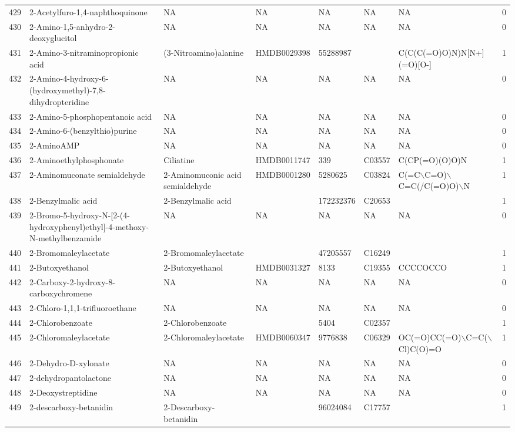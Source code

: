 \documentclass[a4paper]{article}
\begin{document}
\begin{longtable}{rlllllll}
  429 & 2-Acetylfuro-1,4-naphthoquinone & NA & NA & NA & NA & NA & 0 \\ 
  430 & 2-Amino-1,5-anhydro-2-deoxyglucitol & NA & NA & NA & NA & NA & 0 \\ 
  431 & 2-Amino-3-nitraminopropionic acid & (3-Nitroamino)alanine & HMDB0029398 & 55288987 &  & C(C(C(=O)O)N)N[N+](=O)[O-] & 1 \\ 
  432 & 2-Amino-4-hydroxy-6-(hydroxymethyl)-7,8-dihydropteridine & NA & NA & NA & NA & NA & 0 \\ 
  433 & 2-Amino-5-phosphopentanoic acid & NA & NA & NA & NA & NA & 0 \\ 
  434 & 2-Amino-6-(benzylthio)purine & NA & NA & NA & NA & NA & 0 \\ 
  435 & 2-AminoAMP & NA & NA & NA & NA & NA & 0 \\ 
  436 & 2-Aminoethylphosphonate & Ciliatine & HMDB0011747 & 339 & C03557 & C(CP(=O)(O)O)N & 1 \\ 
  437 & 2-Aminomuconate semialdehyde & 2-Aminomuconic acid semialdehyde & HMDB0001280 & 5280625 & C03824 & C(=C$\backslash$C=O)$\backslash$C=C(/C(=O)O)$\backslash$N & 1 \\ 
  438 & 2-Benzylmalic acid & 2-Benzylmalic acid &  & 172232376 & C20653 &  & 1 \\ 
  439 & 2-Bromo-5-hydroxy-N-[2-(4-hydroxyphenyl)ethyl]-4-methoxy-N-methylbenzamide & NA & NA & NA & NA & NA & 0 \\ 
  440 & 2-Bromomaleylacetate & 2-Bromomaleylacetate &  & 47205557 & C16249 &  & 1 \\ 
  441 & 2-Butoxyethanol & 2-Butoxyethanol & HMDB0031327 & 8133 & C19355 & CCCCOCCO & 1 \\ 
  442 & 2-Carboxy-2-hydroxy-8-carboxychromene & NA & NA & NA & NA & NA & 0 \\ 
  443 & 2-Chloro-1,1,1-trifluoroethane & NA & NA & NA & NA & NA & 0 \\ 
  444 & 2-Chlorobenzoate & 2-Chlorobenzoate &  & 5404 & C02357 &  & 1 \\ 
  445 & 2-Chloromaleylacetate & 2-Chloromaleylacetate & HMDB0060347 & 9776838 & C06329 & OC(=O)CC(=O)$\backslash$C=C($\backslash$Cl)C(O)=O & 1 \\ 
  446 & 2-Dehydro-D-xylonate & NA & NA & NA & NA & NA & 0 \\ 
  447 & 2-dehydropantolactone & NA & NA & NA & NA & NA & 0 \\ 
  448 & 2-Deoxystreptidine & NA & NA & NA & NA & NA & 0 \\ 
  449 & 2-descarboxy-betanidin & 2-Descarboxy-betanidin &  & 96024084 & C17757 &  & 1 \\ 

\end{longtable}
\end{document}
